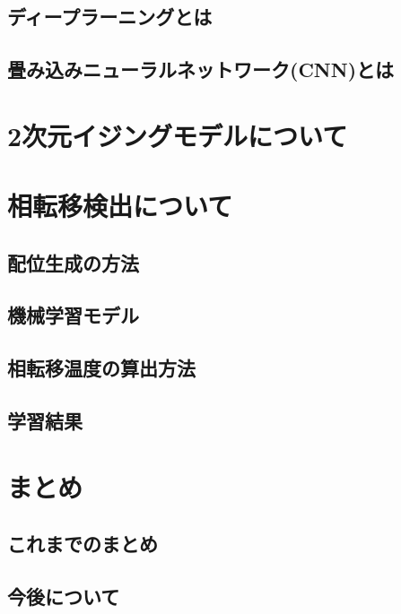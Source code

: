 \documentclass[a4paper,11pt]{jsarticle}
\begin{document}
  \subsection{ディープラーニングとは}
  \subsection{畳み込みニューラルネットワーク(CNN)とは}
\section{2次元イジングモデルについて}
\section{相転移検出について}
  \subsection{配位生成の方法}
  \subsection{機械学習モデル}
  \subsection{相転移温度の算出方法}
  \subsection{学習結果}
\section{まとめ}
  \subsection{これまでのまとめ}
  \subsection{今後について}
\end{document}
